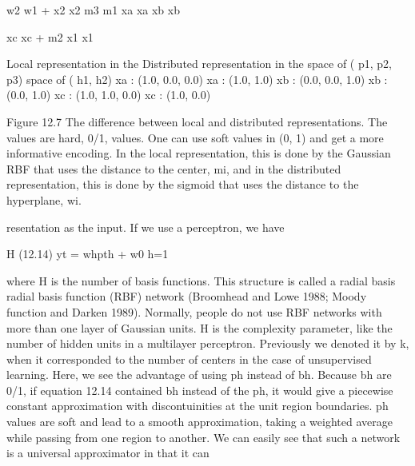 w2 w1 + x2 x2 m3 m1 xa xa xb xb

xc xc + m2 x1 x1

Local representation in the Distributed representation in the space of ( p1, p2, p3) space of ( h1, h2) xa : (1.0, 0.0, 0.0) xa : (1.0, 1.0) xb : (0.0, 0.0, 1.0) xb : (0.0, 1.0) xc : (1.0, 1.0, 0.0) xc : (1.0, 0.0)

Figure 12.7 The difference between local and distributed representations. The values are hard, 0/1, values. One can use soft values in (0, 1) and get a more informative encoding. In the local representation, this is done by the Gaussian RBF that uses the distance to the center, mi, and in the distributed representation, this is done by the sigmoid that uses the distance to the hyperplane, wi.

resentation as the input. If we use a perceptron, we have

H (12.14) yt = whpth + w0 h=1

where H is the number of basis functions. This structure is called a radial basis radial basis function (RBF) network (Broomhead and Lowe 1988; Moody function and Darken 1989). Normally, people do not use RBF networks with more than one layer of Gaussian units. H is the complexity parameter, like the number of hidden units in a multilayer perceptron. Previously we denoted it by k, when it corresponded to the number of centers in the case of unsupervised learning. Here, we see the advantage of using ph instead of bh. Because bh are 0/1, if equation 12.14 contained bh instead of the ph, it would give a piecewise constant approximation with discontuinities at the unit region boundaries. ph values are soft and lead to a smooth approximation, taking a weighted average while passing from one region to another. We can easily see that such a network is a universal approximator in that it can

